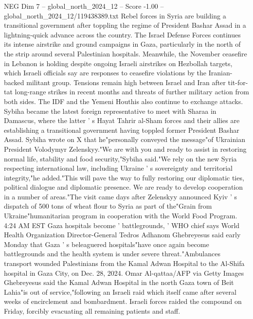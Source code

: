 \begin{textsample}{NEG Dim 7 – global\_north\_2024\_12 – Score -1.00 – global\_north\_2024\_12/119438389.txt}  \label{ex:f7_neg_168}
Rebel forces in Syria are building a transitional government after toppling the regime of President Bashar Assad in a lightning-quick advance across the country.
The Israel Defense Forces continues its intense airstrike and ground campaigns in Gaza, particularly in the north of the strip around several Palestinian hospitals.
Meanwhile, the November ceasefire in Lebanon is holding despite ongoing Israeli airstrikes on Hezbollah targets, which Israeli officials say are responses to ceasefire violations by the Iranian-backed militant group.
Tensions remain high between Israel and Iran after tit-for-tat long-range strikes in recent months and threats of further military action from both sides.
The IDF and the Yemeni Houthis also continue to exchange attacks.
Sybiha became the latest foreign representative to meet with Sharaa in Damascus, where the latter ' s Hayat Tahrir al-Sham forces and their allies are establishing a transitional government having toppled former President Bashar Assad.
Sybiha wrote on X that he"personally conveyed the message"of Ukrainian President Volodymyr Zelenskyy."We are with you and ready to assist in restoring normal life, stability and food security,"Sybiha said."We rely on the new Syria respecting international law, including Ukraine ' s sovereignty and territorial integrity,"he added."This will pave the way to fully restoring our diplomatic ties, political dialogue and diplomatic presence.
We are ready to develop cooperation in a number of areas."The visit came days after Zelenskyy announced Kyiv ' s dispatch of 500 tons of wheat flour to Syria as part of the"Grain from Ukraine"humanitarian program in cooperation with the World Food Program. 4:24 AM EST Gaza hospitals become ' battlegrounds, ' WHO chief says World Health Organization Director-General Tedros Adhanom Ghebreyesus said early Monday that Gaza ' s beleaguered hospitals"have once again become battlegrounds and the health system is under severe threat."Ambulances transport wounded Palestinians from the Kamal Adwan Hospital to the Al-Shifa hospital in Gaza City, on Dec. 28, 2024.
Omar Al-qattaa/AFP via Getty Images Ghebreyesus said the Kamal Adwan Hospital in the north Gaza town of Beit Lahia"is out of service,"following an Israeli raid which itself came after several weeks of encirclement and bombardment.
Israeli forces raided the compound on Friday, forcibly evacuating all remaining patients and staff.

\end{textsample}

